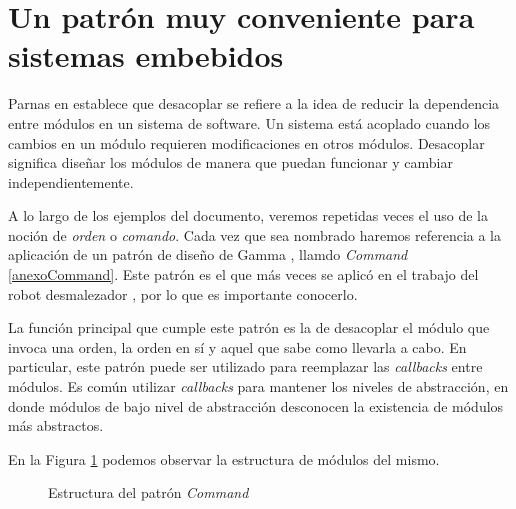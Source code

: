 \section{Un patrón muy conveniente para sistemas embebidos}
\label{patronCommand}

Parnas en \cite{Parnas1972} establece que desacoplar se refiere a la idea de reducir la dependencia entre módulos en un sistema de software. Un sistema está acoplado cuando los cambios en un módulo requieren modificaciones en otros módulos. Desacoplar significa diseñar los módulos de manera que puedan funcionar y cambiar independientemente.

A lo largo de los ejemplos del documento, veremos repetidas veces el uso de la noción de \textit{orden} o \textit{comando}. Cada vez que sea nombrado haremos referencia a la aplicación de un patrón de diseño de Gamma \cite{Gamma:1995:DPE:186897}, llamdo \textit{Command} \ref{anexoCommand}. Este patrón es el que más veces se aplicó en el trabajo del robot desmalezador \cite{laura}, por lo que es importante conocerlo.

La función principal que cumple este patrón es la de desacoplar el módulo que invoca una orden, la orden en sí y aquel que sabe como llevarla a cabo. En particular, este patrón puede ser utilizado para reemplazar las \textit{callbacks} entre módulos. Es común utilizar \textit{callbacks} para mantener los niveles de abstracción, en donde módulos de bajo nivel de abstracción desconocen la existencia de módulos más abstractos.

En la Figura \ref{commandEst} podemos observar la estructura de módulos del mismo.


\begin{figure}[H]
\caption{Estructura del patrón \textit{Command}}
\label{commandEst}
\begin{center}
\end{center}
\end{figure}

